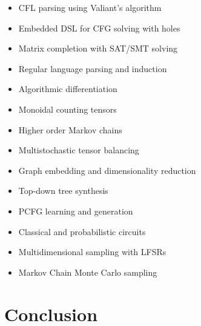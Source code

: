 \documentclass[sigplan,10pt,review,anonymous]{acmart}
\begin{document}
\begin{itemize}
  \item CFL parsing using Valiant's algorithm
  \item Embedded DSL for CFG solving with holes
  \item Matrix completion with SAT/SMT solving
  \item Regular language parsing and induction
  \item Algorithmic differentiation
  \item Monoidal counting tensors
  \item Higher order Markov chains
  \item Multistochastic tensor balancing
  \item Graph embedding and dimensionality reduction
  \item Top-down tree synthesis
  \item PCFG learning and generation
  \item Classical and probabilistic circuits
  \item Multidimensional sampling with LFSRs
  \item Markov Chain Monte Carlo sampling
\end{itemize}

\section{Conclusion}


\end{document}
